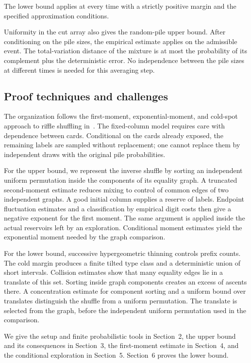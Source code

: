 \documentclass[11pt]{article}
\numberwithin{equation}{section}
\theoremstyle{definition}
\theoremstyle{remark}
\newcommand{\1}{\mathbf 1}
\begin{document}
The lower bound applies at every time with a strictly positive margin
and the specified approximation conditions.

Uniformity in the cut array also gives the random-pile upper bound. After
conditioning on the pile sizes, the empirical estimate applies on the
admissible event. The total-variation distance of the mixture is at most
the probability of its complement plus the deterministic error. No
independence between the pile sizes at different times is needed for this
averaging step.

\subsection{Proof techniques and challenges}

The organization follows the first-moment, exponential-moment, and
cold-spot approach to riffle shuffling in~\cite{SSW}. The fixed-column model
requires care with dependence between cards. Conditional on the cards
already exposed, the remaining labels are sampled without replacement;
one cannot replace them by independent draws with the original pile
probabilities.

For the upper bound, we represent the inverse shuffle by sorting an
independent uniform permutation inside the components of its equality
graph. A truncated second-moment estimate reduces mixing to control of
common edges of two independent graphs. A good initial column supplies a
reserve of labels. Endpoint fluctuation estimates and a classification by
empirical digit costs then give a negative exponent for the first moment.
The same argument is applied inside the actual reservoirs left by an
exploration. Conditional moment estimates yield the exponential moment
needed by the graph comparison.

For the lower bound, successive hypergeometric thinning controls prefix
counts. The cold margin produces a finite tilted type class and a
deterministic union of short intervals. Collision estimates show that many
equality edges lie in a translate of this set. Sorting inside graph
components creates an excess of ascents there. A concentration estimate for
component sorting and a uniform bound over translates distinguish the
shuffle from a uniform permutation. The translate is selected from the
graph, before the independent uniform permutation used in the comparison.

We give the setup and finite probabilistic tools in Section~2, the upper
bound and its consequences in Section~3, the first-moment estimate in
Section~4, and the conditional exploration in Section~5. Section~6 proves
the lower bound.
\end{document}
